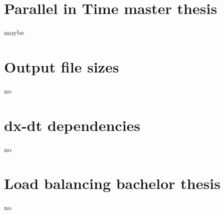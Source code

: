 

\section{Parallel in Time master thesis}
maybe
\section{Output file sizes}
no
\section{dx-dt dependencies} 
no
\section{Load balancing bachelor thesis}
no
